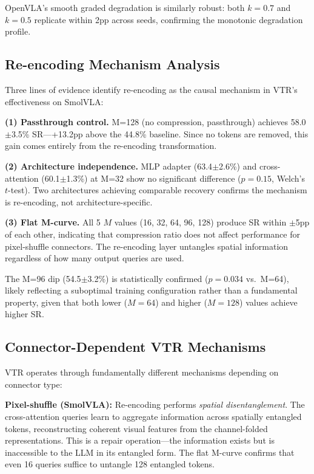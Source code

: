 \documentclass[letterpaper]{article}
\begin{document}
OpenVLA's smooth graded degradation is similarly robust: both $k=0.7$ and $k=0.5$ replicate within 2pp across seeds, confirming the monotonic degradation profile.

\subsection{Re-encoding Mechanism Analysis}

Three lines of evidence identify re-encoding as the causal mechanism in VTR's effectiveness on SmolVLA:

\textbf{(1) Passthrough control.} M=128 (no compression, passthrough) achieves 58.0$\pm$3.5\% SR---+13.2pp above the 44.8\% baseline. Since no tokens are removed, this gain comes entirely from the re-encoding transformation.

\textbf{(2) Architecture independence.} MLP adapter (63.4$\pm$2.6\%) and cross-attention (60.1$\pm$1.3\%) at M=32 show no significant difference ($p=0.15$, Welch's $t$-test). Two architectures achieving comparable recovery confirms the mechanism is re-encoding, not architecture-specific.

\textbf{(3) Flat M-curve.} All 5 $M$ values (16, 32, 64, 96, 128) produce SR within $\pm$5pp of each other, indicating that compression ratio does not affect performance for pixel-shuffle connectors. The re-encoding layer untangles spatial information regardless of how many output queries are used.

The M=96 dip (54.5$\pm$3.2\%) is statistically confirmed ($p=0.034$ vs.\ M=64), likely reflecting a suboptimal training configuration rather than a fundamental property, given that both lower ($M=64$) and higher ($M=128$) values achieve higher SR.

\subsection{Connector-Dependent VTR Mechanisms}

VTR operates through fundamentally different mechanisms depending on connector type:

\textbf{Pixel-shuffle (SmolVLA):} Re-encoding performs \emph{spatial disentanglement}. The cross-attention queries learn to aggregate information across spatially entangled tokens, reconstructing coherent visual features from the channel-folded representations. This is a repair operation---the information exists but is inaccessible to the LLM in its entangled form. The flat M-curve confirms that even 16 queries suffice to untangle 128 entangled tokens.
\end{document}
